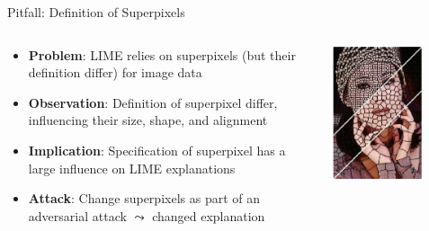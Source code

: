 \documentclass[10pt,compress,t,notes=noshow, xcolor=table]{beamer}
\begin{document}
\begin{frame}{Pitfall: Definition of Superpixels }

\begin{columns}[totalwidth=\textwidth]
    
    \begin{column}{0.64\textwidth}
        
        \begin{itemize}
        	\item \textbf{Problem}: LIME relies on superpixels (but their definition differ) for image data
        	\item \textbf{Observation}: Definition of superpixel differ, influencing their size, shape, and alignment 
        	\pause
        	\item \textbf{Implication}: Specification of superpixel has a large influence on LIME explanations 
        	\item \textbf{Attack}: Change superpixels as part of an adversarial attack $\leadsto$ changed explanation
        \end{itemize}
        
    \end{column}
    
    \begin{column}{0.4\textwidth}
    
        \centering
        \includegraphics[width=0.7\textwidth]{figure/superpixel_woman}
        
    \end{column}
    
\end{columns}

\end{frame}


\endlecture
\end{document}
